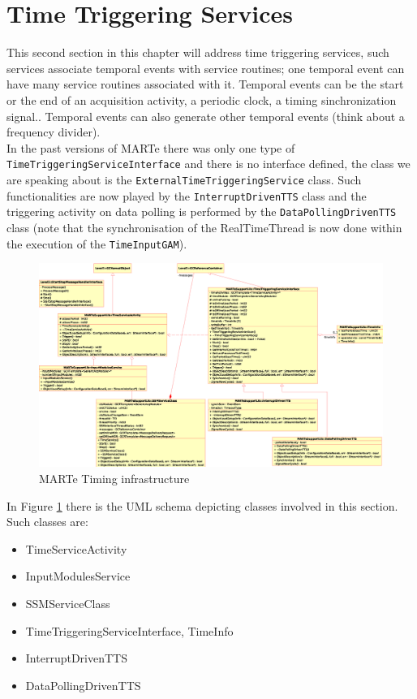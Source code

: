 \section{Time Triggering Services}
This second section in this chapter will address time triggering services, such services associate temporal events with service routines; one temporal event can have many service routines associated with it. Temporal events can be the start or the end of an acquisition activity, a periodic clock, a timing sinchronization signal.. Temporal events can also generate other temporal events (think about a frequency divider). \\


In the past versions of MARTe there was only one type of \texttt{TimeTriggeringServiceInterface} and there is no interface defined, the class we are speaking about is the \texttt{ExternalTimeTriggeringService} class. Such functionalities are now played by the \texttt{InterruptDrivenTTS} class and the triggering activity on data polling is performed by the \texttt{DataPollingDrivenTTS} class (note that the synchronisation of the RealTimeThread is now done within the execution of the \texttt{TimeInputGAM}). \\

\begin{figure}[h!]
 \begin{center}
  \includegraphics[width=\textwidth]{MARTe/MARTe-Timing.eps}
  \caption{MARTe Timing infrastructure}
  \label{f:MARTe:Timing}
 \end{center}
\end{figure}

In Figure \ref{f:MARTe:Timing} there is the UML schema depicting classes involved in this section. Such classes are:

\begin{itemize}
 \item TimeServiceActivity
 \item InputModulesService
 \item SSMServiceClass

 \item TimeTriggeringServiceInterface, TimeInfo
 \item InterruptDrivenTTS
 \item DataPollingDrivenTTS
\end{itemize}

